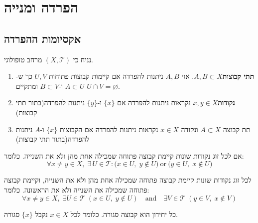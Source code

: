 \documentclass{tstextbook}
\begin{document}
\chapter{הפרדה ומנייה}

\section{אקסיומות ההפרדה}

נניח כי \((X,\mathcal{T})\) מרחב טופולוגי.

\begin{definition}
  \begin{enumerate}
    \item \textbf{תתי קבוצות}\(A,B \subset X\). אזי \(A,B\) ניתנות להפרדה אם קיימות קבוצות פתוחות \(U,V\) כך ש-\(A\subset U\) ו-\(B \subset V\) ומתקיים \(U \cap V = \varnothing\). 


    \item \textbf{נקודות}\(x,y \in X\) נקראות ניתנות להפרדה אם \(\{ x \}\) ו-\(\{ y \}\) ניתנות להפרדה(בתור תתי קבוצות) 


    \item תת קבוצה \(A \subset X\) ונקודה \(x \in X\) נקראות ניתנות להפרדה אם הקבוצות \(\{ x \}\) ו-\(A\) ניתנות להפרדה(בתור תתי קבוצות) 


  \end{enumerate}
\end{definition}
\begin{definition}
אם לכל זוג נקודות שונות קיימת קבוצה פתוחה שמכילה אחת מהן ולא את השנייה. כלומר:
$$\forall x\neq y\in X,\;\exists\,U\in{\mathcal{T}}:{\big(}x\in U,\;y\notin U{\big)}{\mathrm{~or~}}{\big(}y\in U,\;x\notin U{\big)}$$

\end{definition}
\begin{definition}
לכל זוג נקודות שונות קיימת קבוצה פתוחה שמכילה אחת מהן ולא את השנייה, וקיימת קבוצה פתוחה שמכילה את השנייה ולא את הראשונה. כלומר:
$$\forall x\neq y\in X,\;\exists U\in{\mathcal{T}}\;(x\in U,\;y\notin U)\quad{\mathrm{and}}\quad\exists V\in{\mathcal{T}}\;(y\in V,\;x\notin V)$$

\end{definition}
\begin{proposition}
כל יחידון הוא קבוצה סגורה. כלומר לכל \(x \in X\) נקבל \(\{ x \}\) סגורה.

\end{proposition}
\end{document}
